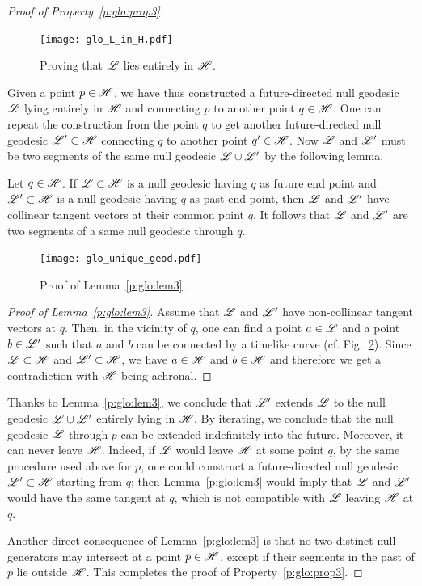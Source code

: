\begin{proof}[Proof of Property~\ref{p:glo:prop3}]
\begin{figure}
\centerline{\texttt{[image: glo\_L\_in\_H.pdf]}}
\caption[]{\label{f:glo:L_in_H} \footnotesize
Proving that $\mathscr{L}$ lies entirely in $\mathscr{H}$.}
\end{figure}



Given a point $p\in\mathscr{H}$, we have thus constructed a
future-directed null geodesic $\mathscr{L}$ lying entirely in $\mathscr{H}$ and
connecting $p$ to another point $q\in\mathscr{H}$. One can
repeat the construction
from the point $q$ to get another future-directed null geodesic $\mathscr{L}'\subset\mathscr{H}$
connecting $q$ to another point $q'\in\mathscr{H}$. Now $\mathscr{L}$ and $\mathscr{L}'$ must
be two segments of the same null geodesic $\mathscr{L}\cup\mathscr{L}'$ by the following lemma.
\begin{lemma}
\label{p:glo:lem3}
Let $q\in\mathscr{H}$. If $\mathscr{L}\subset\mathscr{H}$ is a null geodesic having $q$ as future end point
and $\mathscr{L}'\subset\mathscr{H}$ is a null geodesic having $q$ as past end point, then
$\mathscr{L}$ and $\mathscr{L}'$ have collinear tangent vectors at their common point $q$.
It follows that $\mathscr{L}$ and $\mathscr{L}'$ are two segments of a same null geodesic through $q$.
\end{lemma}
\begin{figure}
\centerline{\texttt{[image: glo\_unique\_geod.pdf]}}
\caption[]{\label{f:glo:unique_geod} \footnotesize
Proof of Lemma~\ref{p:glo:lem3}.}
\end{figure}
\begin{proof}[Proof of Lemma~\ref{p:glo:lem3}]
Assume that $\mathscr{L}$ and $\mathscr{L}'$ have non-collinear tangent vectors at $q$. Then, in
the vicinity of $q$, one can find a point $a\in\mathscr{L}$ and a point $b\in\mathscr{L}'$
such that $a$ and $b$ can be connected by a timelike curve (cf.
Fig.~\ref{f:glo:unique_geod}). Since $\mathscr{L}\subset\mathscr{H}$ and $\mathscr{L}'\subset\mathscr{H}$, we have $a\in\mathscr{H}$ and
$b\in\mathscr{H}$ and therefore we get a contradiction with $\mathscr{H}$ being achronal.
\end{proof}
Thanks to Lemma~\ref{p:glo:lem3}, we conclude that $\mathscr{L}'$ extends $\mathscr{L}$ to the null geodesic
$\mathscr{L}\cup\mathscr{L}'$ entirely lying in $\mathscr{H}$. By iterating, we conclude that
the null geodesic $\mathscr{L}$ through $p$ can be extended indefinitely into the
future. Moreover, it can never leave $\mathscr{H}$. Indeed, if $\mathscr{L}$ would leave $\mathscr{H}$ at
some point $q$, by the same procedure used above for $p$, one could construct a future-directed null geodesic
$\mathscr{L}'\subset\mathscr{H}$ starting from $q$; then Lemma~\ref{p:glo:lem3} would imply that
$\mathscr{L}$ and $\mathscr{L}'$ would have the same tangent at $q$, which is not compatible
with $\mathscr{L}$ leaving $\mathscr{H}$ at $q$.

Another direct consequence of Lemma~\ref{p:glo:lem3} is that no two distinct null generators
may intersect at a point $p\in\mathscr{H}$, except if their segments in the past of
$p$ lie outside $\mathscr{H}$.
This completes the proof of Property~\ref{p:glo:prop3}.
\end{proof}


